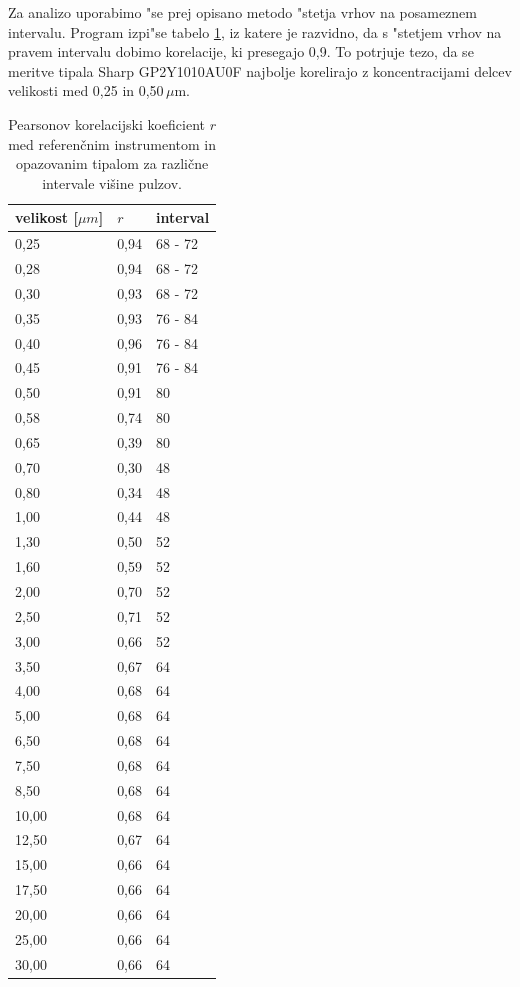 \documentclass[12pt,a4paper]{article}
\begin{document}
Za analizo uporabimo "se prej opisano metodo "stetja vrhov na posameznem intervalu. Program izpi"se tabelo \ref{table:correlations}, iz katere je razvidno, da s "stetjem vrhov na pravem intervalu dobimo korelacije, ki presegajo 0,9. To potrjuje tezo, da se meritve tipala Sharp GP2Y1010AU0F najbolje korelirajo z koncentracijami delcev velikosti med 0,25 in 0,50\,$\mu$m. 

\begin{table}[H]
	\centering
	\begin{tabular}{lll}
		velikost [$\mu m$] & $r$ & interval \\
		\hline
		0,25 & 0,94 & 68 - 72 \\
		0,28 & 0,94 & 68 - 72 \\
		0,30 & 0,93 & 68 - 72 \\
		0,35 & 0,93 & 76 - 84 \\
		0,40 & 0,96 & 76 - 84 \\
		0,45 & 0,91 & 76 - 84 \\
		0,50 & 0,91 & 80 \\
		0,58 & 0,74 & 80 \\
		0,65 & 0,39 & 80 \\
		0,70 & 0,30 & 48 \\
		0,80 & 0,34 & 48 \\
		1,00 & 0,44 & 48 \\
		1,30 & 0,50 & 52 \\
		1,60 & 0,59 & 52 \\
		2,00 & 0,70 & 52 \\
		2,50 & 0,71 & 52 \\
		3,00 & 0,66 & 52 \\
		3,50 & 0,67 & 64 \\
		4,00 & 0,68 & 64 \\
		5,00 & 0,68 & 64 \\
		6,50 & 0,68 & 64 \\
		7,50 & 0,68 & 64 \\
		8,50 & 0,68 & 64 \\
		10,00 & 0,68 & 64 \\
		12,50 & 0,67 & 64 \\
		15,00 & 0,66 & 64 \\
		17,50 & 0,66 & 64 \\
		20,00 & 0,66 & 64 \\
		25,00 & 0,66 & 64 \\
		30,00 & 0,66 & 64
		
	\end{tabular}
	\caption{Pearsonov korelacijski koeficient $r$ med referenčnim instrumentom in opazovanim tipalom za različne intervale višine pulzov.}
	\label{table:correlations}
	\def\arraystretch{1}
\end{table}
\end{document}
